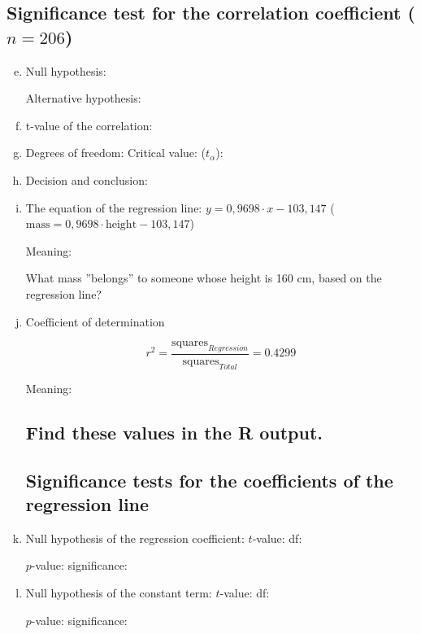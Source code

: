 \subsection*{Significance test for the correlation coefficient ($n = 206$)}  
\begin{enumerate}[a)]\setcounter{enumi}{4}
\item Null hypothesis: \hrulefill		
	
	 Alternative hypothesis: \hrulefill		
\item t-value of the correlation: \hrulefill	
\item Degrees of freedom:	\hrulefill	 \quad Critical value: ($t_\alpha$): 	\hrulefill	
\item Decision and conclusion: \hrulefill		
\item The equation of the regression line: $y = 0,9698\cdot x - 103,147$ ($\textrm{mass} = 0,9698 \cdot \textrm{height}- 103,147$)

	Meaning: 	\hrulefill

	 What mass ''belongs'' to someone whose height is 160 cm, based on the regression line? \hrulefill	


\item Coefficient of determination

$$r^2 = \frac{ \textrm{squares}_{Regression} }{ \textrm{squares}_{Total} } = 0.4299$$

Meaning: 	\hrulefill
\subsection*{Find these values in the R output.}





\subsection*{Significance tests for the coefficients of the regression line}
\item Null hypothesis of the regression coefficient: \hrulefill\quad $t$-value: \hrulefill\quad	df: \hrulefill

$p$-value:	\hrulefill\quad significance:	\hrulefill\quad

\item Null hypothesis of the constant term: \hrulefill\quad $t$-value: \hrulefill\quad df: \hrulefill

$p$-value:	\hrulefill\quad significance:	\hrulefill\quad

\end{enumerate}
\clearpage





